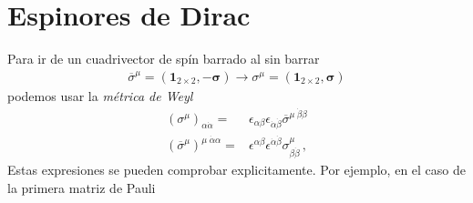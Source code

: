 \section{Espinores de Dirac}

Para ir de un cuadrivector de spín barrado al sin barrar
   \begin{align}
 \overline{\sigma}^{\mu}=\left( \mathbf{1}_{2\times2},-{\boldsymbol{\sigma}} \right) \rightarrow
\sigma^{\mu}= \left( \mathbf{1}_{2\times2},\boldsymbol{\sigma} \right)
\end{align}
podemos usar la \emph{métrica de Weyl}
\begin{align}
  \left( \sigma^{\mu} \right)_{\alpha\dot{\alpha}}=&\epsilon_{\alpha\beta}\epsilon_{\dot{\alpha}\dot{\beta}}\overline{\sigma}^{\mu\ \dot{\beta}\beta} \nonumber\\
  \left( \overline{\sigma}^{\mu} \right)^{\mu\;\dot{\alpha}\alpha}=&\epsilon^{\alpha\beta}\epsilon^{\dot{\alpha}\dot{\beta}}{\sigma}^{\mu}_{\beta\dot{\beta}} \,,
\end{align}
Estas expresiones se pueden comprobar explicitamente. Por ejemplo, en el caso de la primera matriz de Pauli
